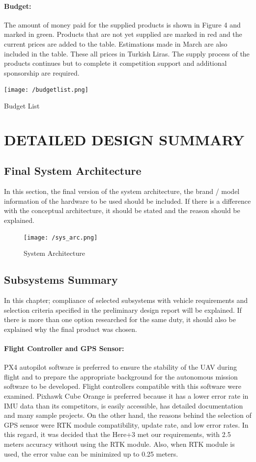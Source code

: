\documentclass[12pt]{article}
\begin{document}
\paragraph*{Budget:}The amount of money paid for the supplied products is shown in Figure 4 and marked in green. Products that are not yet supplied are marked in red and the current prices are added to the table. Estimations made in March are also included in the table. These all prices in Turkish Liras. The supply process of the products continues but to complete it competition support and additional sponsorship are required.
\begin{table}[ht]
 	\centering
 	\texttt{[image: /budgetlist.png]}
 	\caption{Budget List}
        \label{fig:budget}
 \end{table}
\FloatBarrier

\section{DETAILED DESIGN SUMMARY}
\subsection{Final System Architecture}
\justify
In this section, the final version of the system architecture, the brand / model information of the hardware to be used should be included. If there is a difference with the conceptual architecture, it should be stated and the reason should be explained.
\begin{figure}[ht]
 	\centering
 	\texttt{[image: /sys\_arc.png]}
 	\caption{System Architecture}
        \label{fig:budget}
 \end{figure}
\FloatBarrier

\justify

\subsection{Subsystems Summary}
In this chapter; compliance of selected subsystems with vehicle requirements and selection criteria specified in the preliminary design report will be explained. If there is more than one option researched for the same duty, it should also be explained why the final product was chosen. 

\paragraph*{Flight Controller and GPS Sensor:} PX4 autopilot software is preferred to ensure the stability of the UAV during flight and to prepare the appropriate background for the autonomous mission software to be developed. Flight controllers compatible with this software were examined. Pixhawk Cube Orange is preferred because it has a lower error rate in IMU data than its competitors, is easily accessible, has detailed documentation and many sample projects. On the other hand, the reasons behind the selection of GPS sensor were RTK module compatibility, update rate, and low error rates. In this regard, it was decided that the Here+3 met our requirements, with 2.5 meters accuracy without using the RTK module. Also, when RTK module is used, the error value can be minimized up to 0.25 meters. 
\end{document}
